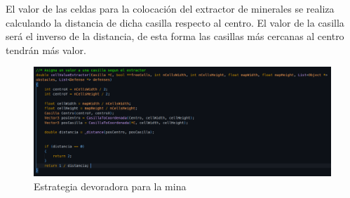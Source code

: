 El valor de las celdas para la colocación del extractor de minerales se realiza calculando la distancia de dicha casilla respecto al centro.
El valor de la casilla será el inverso de la distancia, de esta forma las casillas más cercanas al centro tendrán más valor.

\begin{figure}
\centering
\includegraphics[width=0.7\linewidth]{./CellValueExtractor.png} %
\caption{Estrategia devoradora para la mina}
\label{fig:defenseValueCellsHead}
\end{figure}